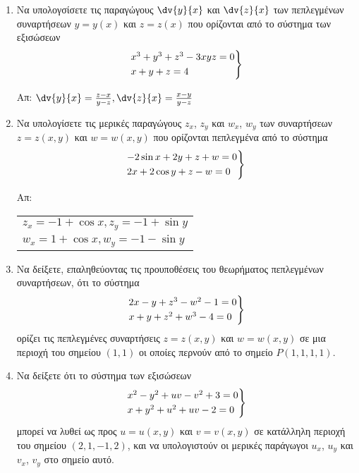 \begin{enumerate}


  \item Να υπολογσίσετε τις παραγώγους $ \dv{y}{x} $ και $ \dv{z}{x}$ των πεπλεγμένων 
    συναρτήσεων $ y=y(x) $ και $ z=z(x) $ που ορίζονται από το σύστημα των εξισώσεων
    \[
      \begin{rcases}
        x^{3} + y^{3} + z^{3} -3xyz = 0 \\
        x+y+z=4 
      \end{rcases}
    \]

    \hfill Απ: $ \dv{y}{x} = \frac{ z-x }{ y-z }, \dv{z}{x} = \frac{ x-y }{ y-z } $ 

  \item Να υπολογίσετε τις μερικές παραγώγους $ z_{x}$, $ z_{y} $ και $ w_{x} $, 
    $ w_{y} $ των συναρτήσεων $ z = z(x,y) $ και $ w = w(x,y) $ που ορίζονται 
    πεπλεγμένα από το σύστημα 
    \[
      \begin{rcases}
        -2 \sin{x} + 2y + z + w = 0  \\
        2x + 2 \cos{y} + z - w = 0 
      \end{rcases} 
    \]

    \hfill Απ: \begin{tabular}{l}
      $ z_{x} = -1 + \cos{x}, z_{y} = -1 + \sin{y} $ \\
      $ w_{x} = 1 + \cos{x}, w_{y} = -1 - \sin{y}  $ 
    \end{tabular}

  \item Να δείξετε, επαληθεύοντας τις προυποθέσεις του θεωρήματος πεπλεγμένων
    συναρτήσεων, ότι το σύστημα 
    \[
      \begin{rcases}
        2x-y+z^{3}-w^{2}-1=0 \\
        x+y+z^{2}+w^{3}-4=0
      \end{rcases} 
    \]
    ορίζει τις πεπλεγμένες συναρτήσεις $ z = z(x,y) $ και $ w = w(x,y) $
    σε μια περιοχή του σημείου $ (1,1) $ οι οποίες περνούν από 
    το σημείο $ P(1,1,1,1) $.

  \item Να δείξετε ότι το σύστημα των εξισώσεων 
    \[
      \begin{rcases}
        x^{2}-y^{2}+uv-v^{2}+3 = 0 \\
        x+y^{2}+u^{2}+uv-2=0
      \end{rcases}
    \]
    μπορεί να λυθεί ως προς $ u = u(x,y) $ και $ v=v(x,y) $ σε κατάλληλη 
    περιοχή του σημείου $ (2,1,-1,2) $, και να υπολογιστούν οι μερικές παράγωγοι 
    $ u_{x} $, $ u_{y} $ και $ v_{x} $, $ v_{y} $ στο σημείο αυτό.


\end{enumerate}
